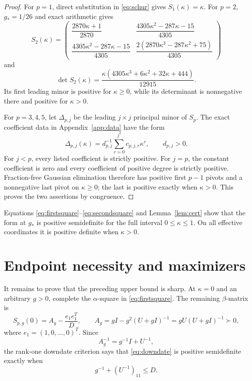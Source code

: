 \documentclass[11pt]{article}
\begin{document}
\begin{proof}
For $p=1$, direct substitution in \eqref{eq:schur} gives
$S_1(\kappa)=\kappa$.  For $p=2$, $g_*=1/26$ and exact arithmetic gives
\[
S_2(\kappa)=
\begin{pmatrix}
\dfrac{2870\kappa+1}{2870}&
\dfrac{4305\kappa^2-287\kappa-15}{4305}\\[5pt]
\dfrac{4305\kappa^2-287\kappa-15}{4305}&
\dfrac{2(2870\kappa^3-287\kappa^2+75)}{4305}
\end{pmatrix}
\]
and
\[
 \det S_2(\kappa)=
 \frac{\kappa(4305\kappa^3+6\kappa^2+32\kappa+444)}{12915}.
\]
Its first leading minor is positive for $\kappa\ge0$, while its
determinant is nonnegative there and positive for $\kappa>0$.

For $p=3,4,5$, let $\Delta_{p,j}$ be the leading $j\times j$ principal
minor of $S_p$.  The exact coefficient data in Appendix~\ref{app:data}
have the form
\[
 \Delta_{p,j}(\kappa)=d_{p,j}^{-1}
 \sum_{r=0}^{j^2}c_{p,j,r}\kappa^r,
 \qquad d_{p,j}>0.
\]
For $j<p$, every listed coefficient is strictly positive.  For $j=p$,
the constant coefficient is zero and every coefficient of positive
degree is strictly positive.  Fraction-free Gaussian elimination
therefore has positive first $p-1$ pivots and a nonnegative last pivot
on $\kappa\ge0$; the last is positive exactly when $\kappa>0$.
This proves the two assertions by congruence.
\end{proof}

Equations \eqref{eq:firstsquare}--\eqref{eq:secondsquare} and
Lemma~\ref{lem:cert} show that the form at $g_*$ is positive
semidefinite for the full interval $0\le\kappa\le1$.  On all effective
coordinates it is positive definite when $\kappa>0$.

\section{Endpoint necessity and maximizers}

It remains to prove that the preceding upper bound is sharp.  At
$\kappa=0$ and an arbitrary $g>0$, complete the $\alpha$-square in
\eqref{eq:firstsquare}.  The remaining $\beta$-matrix is
\begin{equation}
 S_{p,g}(0)=A_g-\frac{e_1e_1^T}{D},\qquad
 A_g=gI-g^2(U+gI)^{-1}=gU(U+gI)^{-1}\succ0,               \label{eq:downdate}
\end{equation}
where $e_1=(1,0,\ldots,0)^T$.  Since
\begin{equation}
 A_g^{-1}=g^{-1}I+U^{-1},                                 \label{eq:ainv}
\end{equation}
the rank-one downdate criterion says that \eqref{eq:downdate} is
positive semidefinite exactly when
\begin{equation}
 g^{-1}+(U^{-1})_{11}\le D.                              \label{eq:rankonecriterion}
\end{equation}
\end{document}
